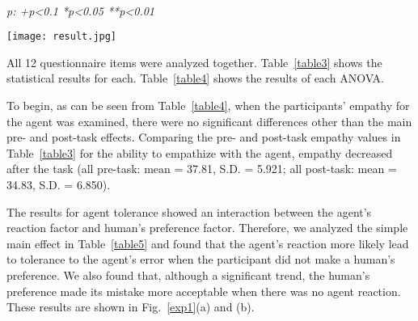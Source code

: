 \documentclass[runningheads]{llncs}
\begin{document}
\begin{table*}[tbp]
\caption{Analysis results of simple main effect}
\centering
{} \\
\hspace{-50mm}
\em{p}:
{{+}p\textless\em{0.1}}
{{*}p\textless\em{0.05}}
{{**}p\textless\em{0.01}}
\label{table5}
\end{table*}

\begin{figure*}[tbp]
		\begin{center}
		\texttt{[image: result.jpg]}
		\caption{Result of each main effect or simple main effect}
		\label{exp1}
	\end{center}
\end{figure*}

All 12 questionnaire items were analyzed together. 
Table~\ref{table3} shows the statistical results for each. 
Table~\ref{table4} shows the results of each ANOVA. 

To begin, as can be seen from Table~\ref{table4}, when the participants' empathy for the agent was examined, there were no significant differences other than the main pre- and post-task effects.
Comparing the pre- and post-task empathy values in Table~\ref{table3} for the ability to empathize with the agent, empathy decreased after the task (all pre-task: mean = 37.81, S.D. = 5.921; all post-task: mean = 34.83, S.D. = 6.850).

The results for agent tolerance showed an interaction between the agent's reaction factor and human's preference factor. 
Therefore, we analyzed the simple main effect in Table~\ref{table5} and found that the agent's reaction more likely lead to tolerance to the agent's error when the participant did not make a human's preference. 
We also found that, although a significant trend, the human's preference made its mistake more acceptable when there was no agent reaction.
These results are shown in Fig.~\ref{exp1}(a) and (b).
\end{document}
